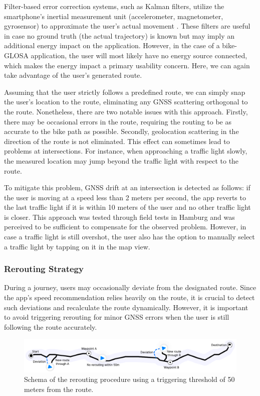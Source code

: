 Filter-based error correction systems, such as Kalman filters, utilize the smartphone's inertial measurement unit (accelerometer, magnetometer, gyrosensor) to approximate the user's actual movement \cite{US20200049837A1}. These filters are useful in case no ground truth (the actual trajectory) is known but may imply an additional energy impact on the application. However, in the case of a bike-GLOSA application, the user will most likely have no energy source connected, which makes the energy impact a primary usability concern. Here, we can again take advantage of the user's generated route.

Assuming that the user strictly follows a predefined route, we can simply snap the user's location to the route, eliminating any GNSS scattering orthogonal to the route. Nonetheless, there are two notable issues with this approach. Firstly, there may be occasional errors in the route, requiring the routing to be as accurate to the bike path as possible. Secondly, geolocation scattering in the direction of the route is not eliminated. This effect can sometimes lead to problems at intersections. For instance, when approaching a traffic light slowly, the measured location may jump beyond the traffic light with respect to the route. 

To mitigate this problem, GNSS drift at an intersection is detected as follows: if the user is moving at a speed less than 2 meters per second, the app reverts to the last traffic light if it is within 10 meters of the user and no other traffic light is closer. This approach was tested through field tests in Hamburg and was perceived to be sufficient to compensate for the observed problem. However, in case a traffic light is still overshot, the user also has the option to manually select a traffic light by tapping on it in the map view.

\subsubsection{Rerouting Strategy}

During a journey, users may occasionally deviate from the designated route. Since the app's speed recommendation relies heavily on the route, it is crucial to detect such deviations and recalculate the route dynamically. However, it is important to avoid triggering rerouting for minor GNSS errors when the user is still following the route accurately.

\begin{figure}[htbp]
\centering
\includegraphics[width=\linewidth]{images/rerouting-strategy.pdf}
\caption{Schema of the rerouting procedure using a triggering threshold of 50 meters from the route.}
\label{fig:rerouting-strategy}
\end{figure}

